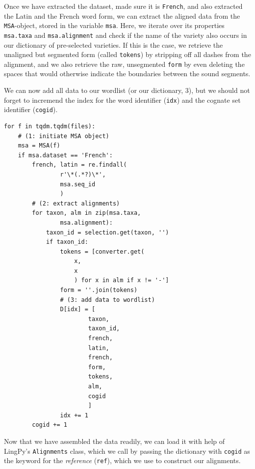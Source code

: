 \documentclass[
  a4paper,
  14pt,
  oneside,
  tablecaptionabove
]{scrbook}
\newcommand{\passthrough}[1]{#1}
\begin{document}
Once we have extracted the dataset, made sure it is
\passthrough{\lstinline!French!}, and also extracted the Latin and the
French word form, we can extract the aligned data from the
\passthrough{\lstinline!MSA!}-object, stored in the variable
\passthrough{\lstinline!msa!}. Here, we iterate over its properties
\passthrough{\lstinline!msa.taxa!} and
\passthrough{\lstinline!msa.alignment!} and check if the name of the
variety also occurs in our dictionary of pre-selected varieties. If this
is the case, we retrieve the unaligned but segmented form (called
\passthrough{\lstinline!tokens!}) by stripping off all dashes from the
alignment, and we also retrieve the raw, unsegmented \passthrough{\lstinline!form!} by even deleting the spaces that would
otherwise indicate the boundaries between the sound segments.

We can now add all data to our wordlist (or our dictionary, 3), but we
should not forget to incremend the index for the word identifier
(\passthrough{\lstinline!idx!}) and the cognate set identifier
(\passthrough{\lstinline!cogid!}).

\begin{lstlisting}
for f in tqdm.tqdm(files):
    # (1: initiate MSA object)
    msa = MSA(f)
    if msa.dataset == 'French':
        french, latin = re.findall(
                r'\*(.*?)\*',
                msa.seq_id
                )
        # (2: extract alignments)
        for taxon, alm in zip(msa.taxa,
                msa.alignment):
            taxon_id = selection.get(taxon, '')
            if taxon_id:
                tokens = [converter.get(
                    x,
                    x
                    ) for x in alm if x != '-']
                form = ''.join(tokens)
                # (3: add data to wordlist)
                D[idx] = [
                        taxon,
                        taxon_id,
                        french,
                        latin,
                        french,
                        form,
                        tokens,
                        alm,
                        cogid
                        ]
                idx += 1
        cogid += 1
\end{lstlisting}

Now that we have assembled the data readily, we can load it with help of
LingPy's \passthrough{\lstinline!Alignments!} class, which we call by
passing the dictionary with \passthrough{\lstinline!cogid!} as the
keyword for the \emph{reference} (\passthrough{\lstinline!ref!}),
which we use to construct our alignments.
\end{document}
